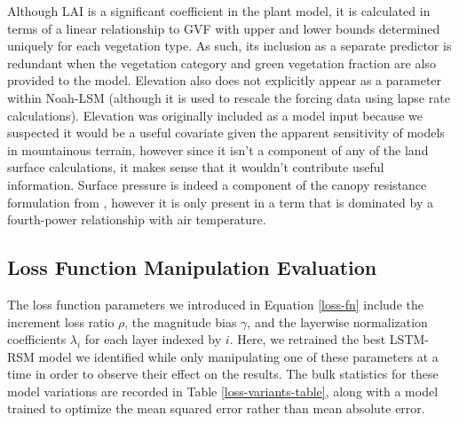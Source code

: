 Although LAI is a significant coefficient in the plant model, it is calculated in terms of a linear relationship to GVF with upper and lower bounds determined uniquely for each vegetation type. As such, its inclusion as a separate predictor is redundant when the vegetation category and green vegetation fraction are also provided to the model. Elevation also does not explicitly appear as a parameter within Noah-LSM (although it is used to rescale the forcing data using lapse rate calculations). Elevation was originally included as a model input because we suspected it would be a useful covariate given the apparent sensitivity of models in mountainous terrain, however since it isn't a component of any of the land surface calculations, it makes sense that it wouldn't contribute useful information. Surface pressure is indeed a component of the canopy resistance formulation from \citep{ek_osu_1991}, however it is only present in a term that is dominated by a fourth-power relationship with air temperature.

\subsection{Loss Function Manipulation Evaluation}

The loss function parameters we introduced in Equation \ref{loss-fn} include the increment loss ratio $\rho$, the magnitude bias $\gamma$, and the layerwise normalization coefficients $\lambda_i$ for each layer indexed by $i$. Here, we retrained the best LSTM-RSM model we identified while only manipulating one of these parameters at a time in order to observe their effect on the results. The bulk statistics for these model variations are recorded in Table \ref{loss-variants-table}, along with a model trained to optimize the mean squared error rather than mean absolute error.

